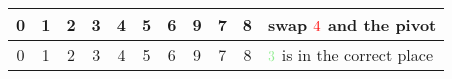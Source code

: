 \begin{center}
\begin{tabular}{ | c | c | c | c | c | c | c | c | c | c || l | }
        \cellcolor{LightGreen}0 & \cellcolor{LightGreen}1 & \color{red}2 & \color{cyan}3 & \color{red}4 & \cellcolor{LightGreen}5 & \cellcolor{LightGreen}6 & \cellcolor{LightGrey}9 & \cellcolor{LightGrey}7 & \cellcolor{LightGrey}8 &swap \(\color{red}4\) and the {\color{cyan}pivot} \\ \hline
        \cellcolor{LightGreen}0 & \cellcolor{LightGreen}1 & 2 & \cellcolor{LightGreen}3 & 4 & \cellcolor{LightGreen}5 & \cellcolor{LightGreen}6 & \cellcolor{LightGrey}9 & \cellcolor{LightGrey}7 & \cellcolor{LightGrey}8 &\(\color{LightGreen}3\) is in the correct place \\ \hline
    \end{tabular}
\end{center}
